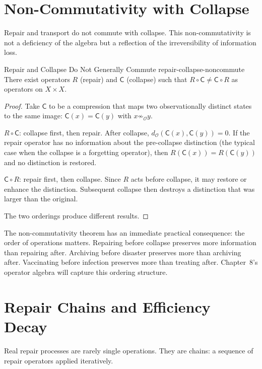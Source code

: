\documentclass[12pt,twoside,openright]{book}
\newcommand{\distPairs}{X\times X}
\newcommand{\obs}{\mathcal{O}}
\newcommand{\distMetric}{d_{\mathcal{O}}}
\providecommand{\collapOp}{\mathsf{C}}
\begin{document}
\section{Non-Commutativity with Collapse}

Repair and transport do not commute with collapse. This
non-commutativity is not a deficiency of the algebra but a
reflection of the irreversibility of information loss.

\begin{theorem}{Repair and Collapse Do Not Generally Commute}%
  {repair-collapse-noncommute}
There exist operators $R$ (repair) and $\collapOp$ (collapse)
such that $R\circ\collapOp\neq\collapOp\circ R$ as operators
on $\distPairs$.
\begin{proof}
Take $\collapOp$ to be a compression that maps two
observationally distinct states to the same image:
$\collapOp(x)=\collapOp(y)$ with $x\not\sim_\obs y$.

$R\circ\collapOp$: collapse first, then repair. After collapse,
$\distMetric(\collapOp(x),\collapOp(y))=0$. If the repair
operator has no information about the pre-collapse distinction
(the typical case when the collapse is a forgetting operator),
then $R(\collapOp(x))=R(\collapOp(y))$ and no distinction is
restored.

$\collapOp\circ R$: repair first, then collapse. Since $R$
acts before collapse, it may restore or enhance the distinction.
Subsequent collapse then destroys a distinction that was larger
than the original.

The two orderings produce different results.
\end{proof}
\end{theorem}

The non-commutativity theorem has an immediate practical
consequence: the order of operations matters. Repairing before
collapse preserves more information than repairing after.
Archiving before disaster preserves more than archiving after.
Vaccinating before infection preserves more than treating after.
Chapter~8's operator algebra will capture this ordering
structure.

\section{Repair Chains and Efficiency Decay}

Real repair processes are rarely single operations. They
are chains: a sequence of repair operators applied iteratively.
\end{document}
